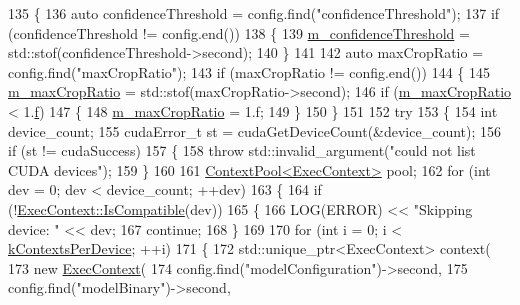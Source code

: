 \begin{DoxyCode}
135 \{
136     \textcolor{keyword}{auto} confidenceThreshold = config.find(\textcolor{stringliteral}{"confidenceThreshold"});
137     \textcolor{keywordflow}{if} (confidenceThreshold != config.end())
138     \{
139         \mbox{\hyperlink{class_s_s_d_custom_net_detector_aa35b98cccf01cd5e9843a1e0c281a03d}{m\_confidenceThreshold}} = std::stof(confidenceThreshold->second);
140     \}
141 
142     \textcolor{keyword}{auto} maxCropRatio = config.find(\textcolor{stringliteral}{"maxCropRatio"});
143     \textcolor{keywordflow}{if} (maxCropRatio != config.end())
144     \{
145         \mbox{\hyperlink{class_s_s_d_custom_net_detector_a41f65cc3327a94be76280cb2ad7f46f8}{m\_maxCropRatio}} = std::stof(maxCropRatio->second);
146         \textcolor{keywordflow}{if} (\mbox{\hyperlink{class_s_s_d_custom_net_detector_a41f65cc3327a94be76280cb2ad7f46f8}{m\_maxCropRatio}} < 1.\mbox{\hyperlink{rings_8cpp_a77369fc4d5326a16d2c603e032023528}{f}})
147         \{
148             \mbox{\hyperlink{class_s_s_d_custom_net_detector_a41f65cc3327a94be76280cb2ad7f46f8}{m\_maxCropRatio}} = 1.f;
149         \}
150     \}
151 
152     \textcolor{keywordflow}{try}
153     \{
154         \textcolor{keywordtype}{int} device\_count;
155         cudaError\_t st = cudaGetDeviceCount(&device\_count);
156         \textcolor{keywordflow}{if} (st != cudaSuccess)
157         \{
158             \textcolor{keywordflow}{throw} std::invalid\_argument(\textcolor{stringliteral}{"could not list CUDA devices"});
159         \}
160 
161         \mbox{\hyperlink{class_queue}{ContextPool<ExecContext>}} pool;
162         \textcolor{keywordflow}{for} (\textcolor{keywordtype}{int} dev = 0; dev < device\_count; ++dev)
163         \{
164             \textcolor{keywordflow}{if} (!\mbox{\hyperlink{class_exec_context_ae0873cef48079986d31639654f915bd0}{ExecContext::IsCompatible}}(dev))
165             \{
166                 LOG(ERROR) << \textcolor{stringliteral}{"Skipping device: "} << dev;
167                 \textcolor{keywordflow}{continue};
168             \}
169 
170             \textcolor{keywordflow}{for} (\textcolor{keywordtype}{int} i = 0; i < \mbox{\hyperlink{_s_s_d_custom_net_detector_8cpp_a123a352b9596fc7d507e96fbe9c44f41}{kContextsPerDevice}}; ++i)
171             \{
172                 std::unique\_ptr<ExecContext> context(
173                         \textcolor{keyword}{new} \mbox{\hyperlink{class_exec_context}{ExecContext}}(
174                                 config.find(\textcolor{stringliteral}{"modelConfiguration"})->second,
175                                 config.find(\textcolor{stringliteral}{"modelBinary"})->second,

\end{DoxyCode}
